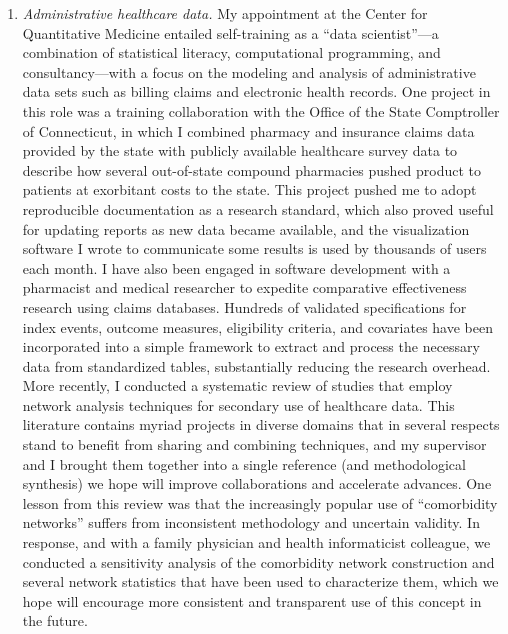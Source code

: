 \documentclass{nihbiosketch}
\begin{document}
\begin{enumerate}
\item \emph{Administrative healthcare data.}
My appointment at the Center for Quantitative Medicine entailed self-training as a ``data scientist''---a combination of statistical literacy, computational programming, and consultancy---with a focus on the modeling and analysis of administrative data sets such as billing claims and electronic health records.
One project in this role was a training collaboration with the Office of the State Comptroller of Connecticut, in which I combined pharmacy and insurance claims data provided by the state with publicly available healthcare survey data to describe how several out-of-state compound pharmacies pushed product to patients at exorbitant costs to the state. This project pushed me to adopt reproducible documentation as a research standard, which also proved useful for updating reports as new data became available, and the visualization software I wrote to communicate some results is used by thousands of users each month.
I have also been engaged in software development with a pharmacist and medical researcher to expedite comparative effectiveness research using claims databases. Hundreds of validated specifications for index events, outcome measures, eligibility criteria, and covariates have been incorporated into a simple framework to extract and process the necessary data from standardized tables, substantially reducing the research overhead.
More recently, I conducted a systematic review of studies that employ network analysis techniques for secondary use of healthcare data. This literature contains myriad projects in diverse domains that in several respects stand to benefit from sharing and combining techniques, and my supervisor and I brought them together into a single reference (and methodological synthesis) we hope will improve collaborations and accelerate advances.
One lesson from this review was that the increasingly popular use of ``comorbidity networks'' suffers from inconsistent methodology and uncertain validity. In response, and with a family physician and health informaticist colleague, we conducted a sensitivity analysis of the comorbidity network construction and several network statistics that have been used to characterize them, which we hope will encourage more consistent and transparent use of this concept in the future.


\end{enumerate}
\end{document}
